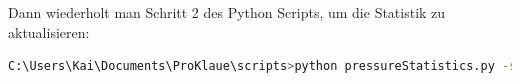 \documentclass[a4paper, openany, oneside]{memoir}
\begin{document}
Dann wiederholt man Schritt 2 des Python Scripts, um die Statistik zu aktualisieren:


\begin{minipage}[c]{\textwidth}
\begin{lstlisting}[language=bash]
C:\Users\Kai\Documents\ProKlaue\scripts>python pressureStatistics.py -s 2 -t 0.5 -b "Klaue 1 (K1T)" -g "gummi" -d "C:/Users/Kai/Documents/ProKlaue/testdaten/druck"
\end{lstlisting}
\end{minipage}
\end{document}
